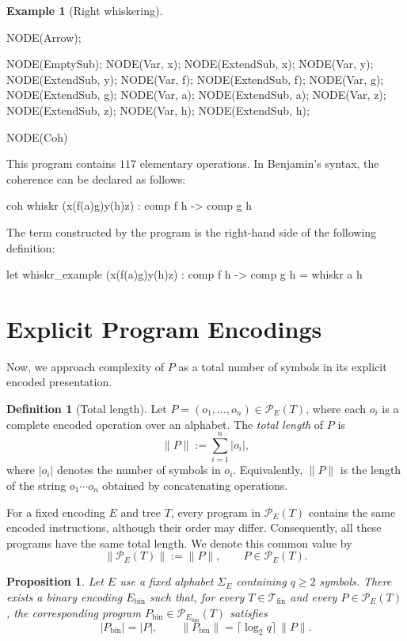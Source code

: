 \documentclass{article}%
\newtheorem{proposition}[theorem]{Proposition}
\theoremstyle{remark}
\theoremstyle{definition}
\newtheorem{example}[theorem]{Example}
\theoremstyle{definition}
\newtheorem{definition}[theorem]{Definition}
\theoremstyle{plain}
\begin{document}
\begin{example}[Right whiskering]
\begin{githubcode}
NODE(Arrow);

NODE(EmptySub);
NODE(Var, x); NODE(ExtendSub, x);
NODE(Var, y); NODE(ExtendSub, y);
NODE(Var, f); NODE(ExtendSub, f);
NODE(Var, g); NODE(ExtendSub, g);
NODE(Var, a); NODE(ExtendSub, a);
NODE(Var, z); NODE(ExtendSub, z);
NODE(Var, h); NODE(ExtendSub, h);

NODE(Coh)
\end{githubcode}

This program contains \(117\) elementary operations. In Benjamin's syntax, the
coherence can be declared as follows:

\begin{githubcode}
coh whiskr (x(f(a)g)y(h)z) : comp f h -> comp g h
\end{githubcode}

The term constructed by the program is the right-hand side of the following
definition:

\begin{githubcode}
let whiskr_example (x(f(a)g)y(h)z)
    : comp f h -> comp g h
    = whiskr a h
\end{githubcode}
\end{example}

\section{Explicit Program Encodings}
Now, we approach complexity of \(P\) as a total number of symbols in its
explicit encoded presentation.

\begin{definition}[Total length]
\label{def:program-total-length}
Let \(P=(o_1,\ldots,o_n)\in\mathcal P_E(T)\), where each \(o_i\) is a complete
encoded operation over an alphabet. The \emph{total length} of \(P\) is
\[
  \|P\| := \sum_{i=1}^{n}|o_i|,
\]
where \(|o_i|\) denotes the number of symbols in \(o_i\). Equivalently,
\(\|P\|\) is the length of the string \(o_1\cdots o_n\) obtained by
concatenating operations.

For a fixed encoding \(E\) and tree \(T\), every program in \(\mathcal P_E(T)\)
contains the same encoded instructions, although their order may differ.
Consequently, all these programs have the same total length. We denote this
common value by
\[
  \|\mathcal P_E(T)\| := \|P\|,
  \qquad P\in\mathcal P_E(T).
\]
\end{definition}

\begin{proposition}
Let \(E\) use a fixed alphabet \(\Sigma_E\) containing \(q\geq 2\) symbols.
There exists a binary encoding \(E_{\mathrm{bin}}\) such that, for every
\(T\in\mathcal{T}_\text{fin}\) and every \(P\in\mathcal P_E(T)\), the corresponding
program \(P_{\mathrm{bin}}\in\mathcal P_{E_{\mathrm{bin}}}(T)\) satisfies
\[
  |P_{\mathrm{bin}}|=|P|,
  \qquad
  \|P_{\mathrm{bin}}\|
  =\lceil\log_2 q\rceil\,\|P\|.
\]
\end{proposition}
\end{document}
